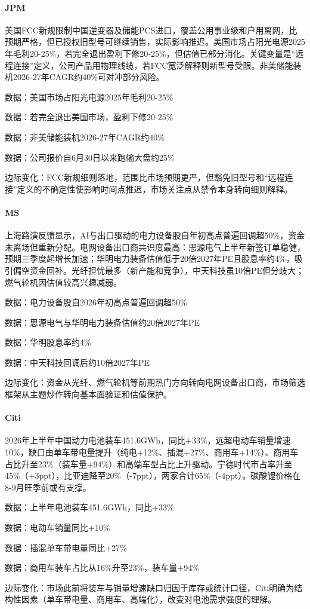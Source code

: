 \documentclass[11pt]{ctexart}
\begin{document}
\paragraph{JPM} 美国FCC新规限制中国逆变器及储能PCS进口，覆盖公用事业级和户用离网，比预期严格，但已授权旧型号可继续销售，实际影响推迟。美国市场占阳光电源2025年毛利20-25\%，若完全退出盈利下修20-25\%，但估值已部分消化。关键变量是“远程连接”定义，公司产品用物理线缆，若FCC宽泛解释则新型号受限。非美储能装机2026-27年CAGR约40\%可对冲部分风险。
{\small\color{refgray}数据：美国市场占阳光电源2025年毛利20-25\%\par}
{\small\color{refgray}数据：若完全退出美国市场，盈利下修20-25\%\par}
{\small\color{refgray}数据：非美储能装机2026-27年CAGR约40\%\par}
{\small\color{refgray}数据：公司报价自6月30日以来跑输大盘约25\%\par}
{\small\color{refgray}边际变化：FCC新规细则落地，范围比市场预期更严，但豁免旧型号和“远程连接”定义的不确定性使影响时间点推迟，市场关注点从禁令本身转向细则解释。\par}
\paragraph{MS} 上海路演反馈显示，AI与出口驱动的电力设备股自年初高点普遍回调超50\%，资金未离场但重新分配。电网设备出口商共识度最高：思源电气上半年新签订单稳健，预期三季度起增长加速；华明电力装备估值低于20倍2027年PE且股息率约4\%，吸引偏空资金回补。光纤担忧最多（新产能和竞争），中天科技虽10倍PE但分歧大；燃气轮机因估值较高兴趣减弱。
{\small\color{refgray}数据：电力设备股自2026年初高点普遍回调超50\%\par}
{\small\color{refgray}数据：思源电气与华明电力装备估值约20倍2027年PE\par}
{\small\color{refgray}数据：华明股息率约4\%\par}
{\small\color{refgray}数据：中天科技回调后约10倍2027年PE\par}
{\small\color{refgray}边际变化：资金从光纤、燃气轮机等前期热门方向转向电网设备出口商，市场筛选框架从主题炒作转向基本面验证和估值保护。\par}
\paragraph{Citi} 2026年上半年中国动力电池装车451.6GWh，同比+33\%，远超电动车销量增速10\%，缺口由单车带电量提升（纯电+12\%、插混+27\%、商用车+14\%）、商用车占比升至23\%（装车量+94\%）和高端车型占比上升驱动。宁德时代市占率升至45\%（+3ppt），比亚迪降至20\%（-7ppt），两家合计65\%（-4ppt）。碳酸锂价格在8-9月旺季前或有支撑。
{\small\color{refgray}数据：上半年电池装车451.6GWh，同比+33\%\par}
{\small\color{refgray}数据：电动车销量同比+10\%\par}
{\small\color{refgray}数据：插混单车带电量同比+27\%\par}
{\small\color{refgray}数据：商用车装车占比从16\%升至23\%，装车量+94\%\par}
{\small\color{refgray}边际变化：市场此前将装车与销量增速缺口归因于库存或统计口径，Citi明确为结构性因素（单车带电量、商用车、高端化），改变对电池需求强度的理解。\par}
\end{document}
